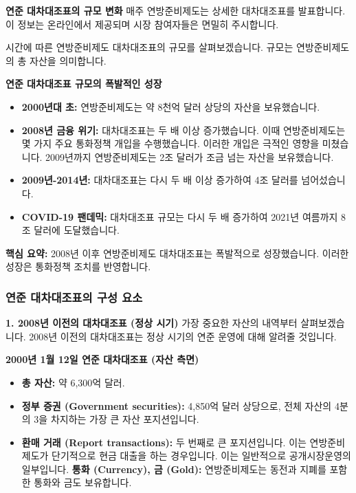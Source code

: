 \documentclass[11pt,a4paper]{book}
\theoremstyle{definition}
\begin{document}
\textbf{연준 대차대조표의 규모 변화}
매주 연방준비제도는 상세한 대차대조표를 발표합니다. 이 정보는 온라인에서 제공되며 시장 참여자들은 면밀히 주시합니다.

시간에 따른 연방준비제도 대차대조표의 규모를 살펴보겠습니다. 규모는 연방준비제도의 총 자산을 의미합니다.

\begin{examplebox}
\textbf{연준 대차대조표 규모의 폭발적인 성장}
\begin{itemize}
    \item \textbf{2000년대 초:} 연방준비제도는 약 8천억 달러 상당의 자산을 보유했습니다.
    \item \textbf{2008년 금융 위기:} 대차대조표는 두 배 이상 증가했습니다. 이때 연방준비제도는 몇 가지 주요 통화정책 개입을 수행했습니다. 이러한 개입은 극적인 영향을 미쳤습니다. 2009년까지 연방준비제도는 2조 달러가 조금 넘는 자산을 보유했습니다.
    \item \textbf{2009년-2014년:} 대차대조표는 다시 두 배 이상 증가하여 4조 달러를 넘어섰습니다.
    \item \textbf{COVID-19 팬데믹:} 대차대조표 규모는 다시 두 배 증가하여 2021년 여름까지 8조 달러에 도달했습니다.
\end{itemize}
\textbf{핵심 요약:} 2008년 이후 연방준비제도 대차대조표는 폭발적으로 성장했습니다. 이러한 성장은 통화정책 조치를 반영합니다.
\end{examplebox}

\subsubsection*{연준 대차대조표의 구성 요소}

\textbf{1. 2008년 이전의 대차대조표 (정상 시기)}
가장 중요한 자산의 내역부터 살펴보겠습니다. 2008년 이전의 대차대조표는 정상 시기의 연준 운영에 대해 알려줄 것입니다.

\begin{examplebox}
\textbf{2000년 1월 12일 연준 대차대조표 (자산 측면)}
\begin{itemize}
    \item \textbf{총 자산:} 약 6,300억 달러.
    \item \textbf{정부 증권 (Government securities):} 4,850억 달러 상당으로, 전체 자산의 4분의 3을 차지하는 가장 큰 자산 포지션입니다.
    \item \textbf{환매 거래 (Report transactions):} 두 번째로 큰 포지션입니다. 이는 연방준비제도가 단기적으로 현금 대출을 하는 경우입니다. 이는 일반적으로 공개시장운영의 일부입니다.
    \textbf{통화 (Currency), 금 (Gold):} 연방준비제도는 동전과 지폐를 포함한 통화와 금도 보유합니다.
\end{itemize}
\end{examplebox}
\end{document}
